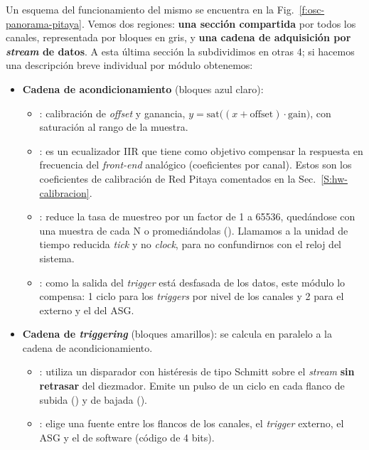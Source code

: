 Un esquema del funcionamiento del mismo se encuentra en la
Fig.~\ref{f:osc-panorama-pitaya}. Vemos dos regiones: \textbf{una sección
compartida} por todos los canales, representada por bloques en gris, y
\textbf{una cadena de adquisición por \emph{stream} de datos}. A esta última sección la
subdividimos en otras 4; si hacemos una descripción breve individual por módulo
obtenemos:
\begin{itemize}
  \item \textbf{Cadena de acondicionamiento} (bloques azul claro):
  \begin{itemize}
    \item {}: calibración de \emph{offset} y ganancia,
      $y = \mathrm{sat}\big((x + \text{offset}) \cdot \text{gain}\big)$, con
      saturación al rango de la muestra.
    \item {}: es un ecualizador IIR que tiene como objetivo
      compensar la respuesta en frecuencia del \emph{front-end} analógico
      (coeficientes  por canal). Estos son los
      coeficientes de calibración de Red Pitaya comentados en la
      Sec.~\ref{S:hw-calibracion}.
    \item {}: reduce la tasa de muestreo por un factor de 1 a
      65536, quedándose con una muestra de cada N o promediándolas
      (). Llamamos a la unidad de tiempo reducida \emph{tick} y
      no \emph{clock}, para no confundirnos con el reloj del sistema.
    \item {}: como la salida del \emph{trigger} está desfasada de los
      datos, este módulo lo compensa: 1 ciclo para los \emph{triggers} por nivel de
      los canales y 2 para el externo y el del ASG.
  \end{itemize}
  \item \textbf{Cadena de \emph{triggering}} (bloques amarillos): se calcula en
    paralelo a la cadena de acondicionamiento.
  \begin{itemize}
    \item {}: utiliza un disparador con histéresis de tipo
      Schmitt sobre el \emph{stream} \textbf{sin retrasar} del diezmador. Emite un pulso
      de un ciclo en cada flanco de subida () y de bajada
      ().
    \item {}: elige una fuente entre los flancos de los
      canales, el \emph{trigger} externo, el ASG y el de software (código de 4 bits).
  \end{itemize}

\end{itemize}
